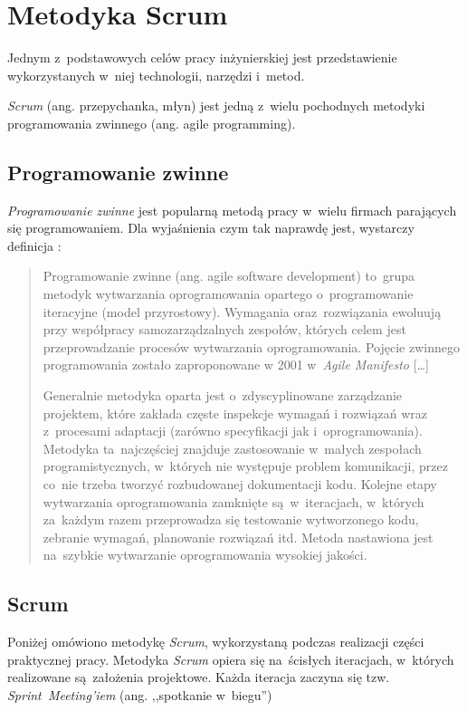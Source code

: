 \section{Metodyka Scrum} \label{scrum}

Jednym z~podstawowych celów pracy inżynierskiej jest przedstawienie wykorzystanych w~niej technologii, narzędzi i~metod.


\textit{Scrum} \cite{scrumalliance} (ang. przepychanka, młyn) jest jedną z~wielu pochodnych metodyki programowania zwinnego \cite{agile1} (ang. agile programming).

\subsection{Programowanie zwinne} \label{scrum.agile}

\textit{Programowanie zwinne} jest popularną metodą pracy w~wielu firmach parających się programowaniem. Dla wyjaśnienia czym tak naprawdę jest, wystarczy definicja \cite{agile2}:

\begin{quote}
Programowanie zwinne (ang. agile software development) to~grupa metodyk wytwarzania oprogramowania opartego o~programowanie iteracyjne (model przyrostowy). Wymagania oraz~rozwiązania ewolu\-ują przy współpracy samozarządzalnych zespołów, których celem jest przeprowadzanie procesów wytwarzania oprogramowania. Pojęcie zwinnego programowania zostało zaproponowane w 2001 w~\textit{Agile Manifesto} \cite{agile.manifesto}
[\ldots]


Generalnie metodyka oparta jest o~zdyscyplinowane zarządzanie projektem, które zakłada częste inspekcje wymagań i rozwiązań wraz z~procesami adaptacji (zarówno specyfikacji jak i~oprogramowania). Metodyka ta~najczęściej znajduje zastosowanie w~małych zespołach programistycznych, w~których nie występuje problem komunikacji, przez co~nie trzeba tworzyć rozbudowanej dokumentacji kodu. Kolejne etapy wytwarzania oprogramowania zamknięte są~w~iteracjach, w~których za~każdym razem przeprowadza się testowanie wytworzonego kodu, zebranie wymagań, planowanie rozwiązań itd. Metoda nastawiona jest na~szybkie wytwarzanie oprogramowania wysokiej jakości.
\end{quote}

\subsection{Scrum} \label{scrum.scrum}

Poniżej omówiono metodykę \textit{Scrum}, wykorzystaną podczas realizacji części praktycznej pracy. Metodyka \textit{Scrum} opiera się na~ścisłych iteracjach, w~których realizowane są~założenia projektowe. Każda iteracja zaczyna się tzw. \textit{Sprint~Meeting'iem} (ang. ,,spotkanie w~biegu'') \cite{scrumaliance}

